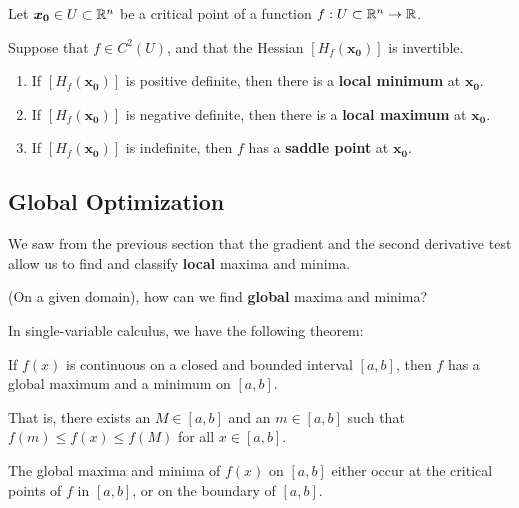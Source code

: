 \begin{theorem}

Let $\bm{x_0} \in U \subset \mathbb{R}^n$ be a critical point of a function $f : U \subset \mathbb{R}^n \to \mathbb{R}$. 

\vspace{.5em}
Suppose that $f \in C^2(U)$, and that the Hessian $[H_f(\bm{x_0})]$ is invertible.

\begin{enumerate}
    \item If $[H_f(\bm{x_0})]$ is positive definite, then there is a \textbf{local minimum} at $\bm{x_0}$.
    \item If $[H_f(\bm{x_0})]$ is negative definite, then there is a \textbf{local maximum} at $\bm{x_0}$. 
    \item If $[H_f(\bm{x_0})]$ is indefinite, then $f$ has a \textbf{saddle point} at $\bm{x_0}$. 
\end{enumerate}

\end{theorem}


\subsection{Global Optimization}

We saw from the previous section that the gradient and the second derivative test allow us to find and classify \textbf{local} maxima and minima.
    
    \begin{motivating}
    (On a given domain), how can we find \textbf{global} maxima and minima?
    \end{motivating}

In single-variable calculus, we have the following theorem:

\begin{theorem}
    If $f(x)$ is continuous on a closed and bounded interval $[a,b]$, then $f$ has a global maximum and a minimum on $[a,b]$.
    
    \vspace{1em}
    
    That is, there exists an $M \in [a,b]$ and an $m \in [a,b]$ such that $f(m) \leq f(x) \leq f(M)$ for all $x \in [a,b]$.
    \end{theorem}
    
    
    \begin{theorem}
    The global maxima and minima of $f(x)$ on $[a,b]$ either occur at the critical points of $f$ in $[a,b]$, or on the boundary of $[a,b]$.
    \end{theorem}

